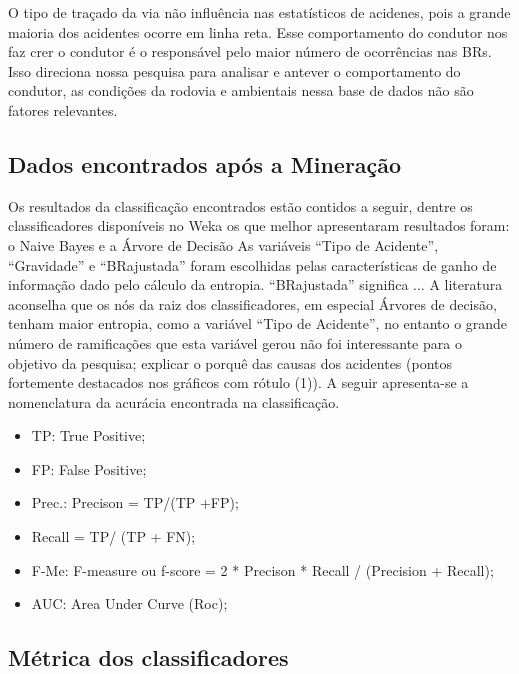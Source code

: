 O tipo de traçado da via não influência nas estatísticos de acidenes, pois a grande maioria dos acidentes ocorre em linha reta.
Esse comportamento do condutor nos faz crer o condutor é o responsável pelo maior número de ocorrências nas BRs.
Isso direciona nossa pesquisa para analisar e antever o comportamento do condutor, as condições da rodovia e ambientais nessa base
de dados não são fatores relevantes.

\pagebreak



\subsection{Dados encontrados após a Mineração}

Os resultados da classificação encontrados estão contidos a
seguir, dentre os classificadores disponíveis no Weka os que
melhor apresentaram resultados foram: o Naive Bayes e a
Árvore de Decisão
As variáveis “Tipo de Acidente”, “Gravidade” e
“BRajustada” foram escolhidas pelas características de ganho
de informação dado pelo cálculo da entropia. “BRajustada”
significa ... A literatura aconselha que os nós da raiz dos
classificadores, em especial Árvores de decisão, tenham maior
entropia, como a variável “Tipo de Acidente”, no entanto o
grande número de ramificações que esta variável gerou não foi
interessante para o objetivo da pesquisa; explicar o porquê das
causas dos acidentes (pontos fortemente destacados nos gráficos com rótulo (1)). 
A seguir apresenta-se a nomenclatura da acurácia encontrada na classificação.

\begin{itemize}
	\item TP: True Positive;
	\item FP: False Positive;
	\item Prec.: Precison = TP/(TP +FP);
	\item Recall = TP/ (TP + FN);
	\item F-Me: F-measure ou f-score = 2 * Precison * Recall / (Precision + Recall);
	\item AUC: Area Under Curve (Roc);
\end{itemize}
    
\subsection{Métrica dos classificadores}


